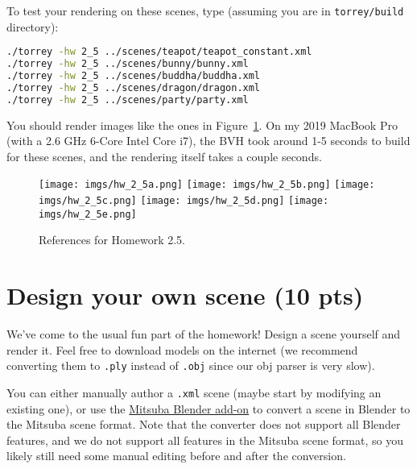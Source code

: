 To test your rendering on these scenes, type (assuming you are in \lstinline{torrey/build} directory):
\begin{lstlisting}[language=bash]
./torrey -hw 2_5 ../scenes/teapot/teapot_constant.xml
./torrey -hw 2_5 ../scenes/bunny/bunny.xml
./torrey -hw 2_5 ../scenes/buddha/buddha.xml
./torrey -hw 2_5 ../scenes/dragon/dragon.xml
./torrey -hw 2_5 ../scenes/party/party.xml
\end{lstlisting}

You should render images like the ones in Figure~\ref{fig:hw_2_5}. On my 2019 MacBook Pro (with a 2.6 GHz 6-Core Intel Core i7), the BVH took around 1-5 seconds to build for these scenes, and the rendering itself takes a couple seconds.
\begin{figure}[ht]
    \centering
    \texttt{[image: imgs/hw\_2\_5a.png]}
    \texttt{[image: imgs/hw\_2\_5b.png]}
    \texttt{[image: imgs/hw\_2\_5c.png]}
    \texttt{[image: imgs/hw\_2\_5d.png]}
    \texttt{[image: imgs/hw\_2\_5e.png]}
    \caption{References for Homework 2.5.}
    \label{fig:hw_2_5}
\end{figure}

\section{Design your own scene (10 pts)}
We've come to the usual fun part of the homework! Design a scene yourself and render it. Feel free to download models on the internet (we recommend converting them to \lstinline{.ply} instead of \lstinline{.obj} since our obj parser is very slow). 

You can either manually author a \lstinline{.xml} scene (maybe start by modifying an existing one), or use the \href{https://github.com/mitsuba-renderer/mitsuba-blender}{Mitsuba Blender add-on} to convert a scene in Blender to the Mitsuba scene format. Note that the converter does not support all Blender features, and we do not support all features in the Mitsuba scene format, so you likely still need some manual editing before and after the conversion.

